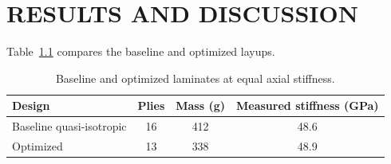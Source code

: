 \chapter{RESULTS AND DISCUSSION}
\label{ch:results}

Table~\ref{tab:design} compares the baseline and optimized layups.

\begin{table}[htbp]
  \centering
  \caption{Baseline and optimized laminates at equal axial stiffness.}
  \label{tab:design}
  \begin{tabular}{lccc}
    \toprule
    Design & Plies & Mass (g) & Measured stiffness (GPa) \\
    \midrule
    Baseline quasi-isotropic & 16 & 412 & 48.6 \\
    Optimized                & 13 & 338 & 48.9 \\
    \bottomrule
  \end{tabular}
\end{table}
